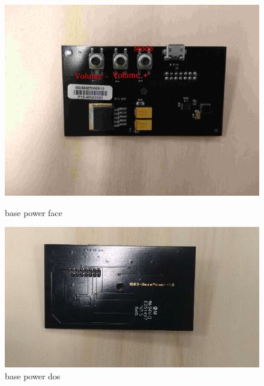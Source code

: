 \documentclass{article}
\begin{document}
\begin{figure}[H]
  \centering
  \begin{minipage}[b]{0.45\textwidth}
    \includegraphics[width=\textwidth]{power_face_boutons.jpg}
    \caption{base power face}
  \end{minipage}
  \hfill
  \begin{minipage}[b]{0.45\textwidth}
    \includegraphics[width=\textwidth]{power_dos.png}
      \caption{base power dos}
  \end{minipage}
\end{figure}
\end{document}
